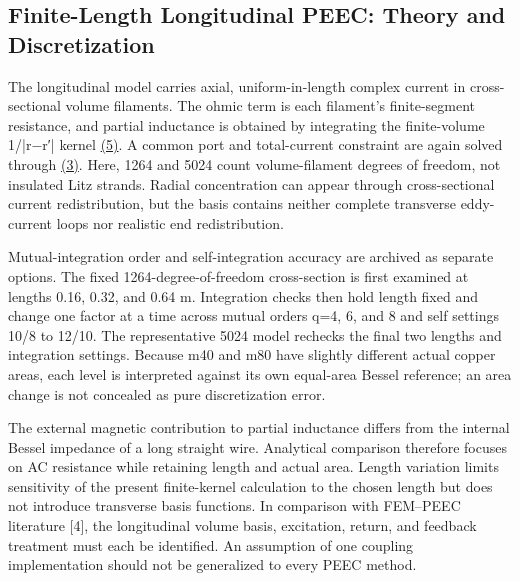 \documentclass[11pt]{article}
\begin{document}
\subsection*{Finite-Length Longitudinal PEEC: Theory and Discretization}
\hypertarget{02.peec_method.heading}{}
The longitudinal model carries axial, uniform-in-length complex current in cross-sectional volume filaments. The ohmic term is each filament’s finite-segment resistance, and partial inductance is obtained by integrating the finite-volume 1/|r−r′| kernel \href{paper_en_single.pdf#E08}{(5)}. A common port and total-current constraint are again solved through \href{paper_en_single.pdf#E04}{(3)}. Here, 1264 and 5024 count volume-filament degrees of freedom, not insulated Litz strands. Radial concentration can appear through cross-sectional current redistribution, but the basis contains neither complete transverse eddy-current loops nor realistic end redistribution.


Mutual-integration order and self-integration accuracy are archived as separate options. The fixed 1264-degree-of-freedom cross-section is first examined at lengths 0.16, 0.32, and 0.64 m. Integration checks then hold length fixed and change one factor at a time across mutual orders q=4, 6, and 8 and self settings 10/8 to 12/10. The representative 5024 model rechecks the final two lengths and integration settings. Because m40 and m80 have slightly different actual copper areas, each level is interpreted against its own equal-area Bessel reference; an area change is not concealed as pure discretization error.


The external magnetic contribution to partial inductance differs from the internal Bessel impedance of a long straight wire. Analytical comparison therefore focuses on AC resistance while retaining length and actual area. Length variation limits sensitivity of the present finite-kernel calculation to the chosen length but does not introduce transverse basis functions. In comparison with FEM–PEEC literature [4], the longitudinal volume basis, excitation, return, and feedback treatment must each be identified. An assumption of one coupling implementation should not be generalized to every PEEC method.
\end{document}

